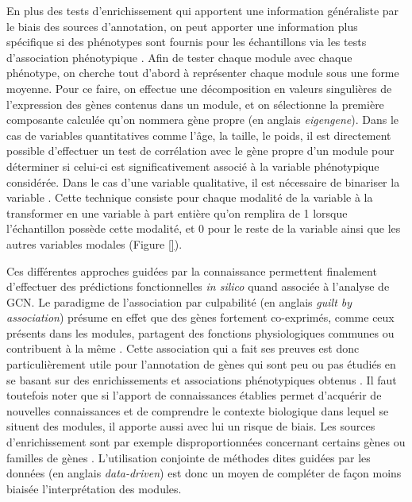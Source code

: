 

En plus des tests d'enrichissement qui apportent une information généraliste par le biais des sources d'annotation, on peut apporter une information plus spécifique si des phénotypes sont fournis pour les échantillons via les tests d'association phénotypique \cite{Langfelder2008}. Afin de tester chaque module avec chaque phénotype, on cherche tout d'abord à représenter chaque module sous une forme moyenne. Pour ce faire, on effectue une décomposition en valeurs singulières de l'expression des gènes contenus dans un module, et on sélectionne la première composante calculée qu'on nommera gène propre (en anglais \textit{eigengene}). Dans le cas de variables quantitatives comme l'âge, la taille, le poids, il est directement possible d'effectuer un test de corrélation avec le gène propre d'un module pour déterminer si celui-ci est significativement associé à la variable phénotypique considérée. Dans le cas d'une variable qualitative, il est nécessaire de binariser la variable \cite{Lemoine2021Dec}. Cette technique consiste pour chaque modalité de la variable à la transformer en une variable à part entière qu'on remplira de 1 lorsque l'échantillon possède cette modalité, et 0 pour le reste de la variable ainsi que les autres variables modales (Figure \ref{}).


Ces différentes approches guidées par la connaissance permettent finalement d'effectuer des prédictions fonctionnelles \textit{in silico} quand associée à l'analyse de \acrshort{GCN}. Le paradigme de l'association par culpabilité (en anglais \textit{guilt by association}) présume en effet que des gènes fortement co-exprimés, comme ceux présents dans les modules, partagent des fonctions physiologiques communes ou contribuent à la même \cite{Ballouz2015}. Cette association qui a fait ses preuves est donc particulièrement utile pour l'annotation de gènes qui sont peu ou pas étudiés en se basant sur des enrichissements et associations phénotypiques obtenus \cite{Wolfe2005}. Il faut toutefois noter que si l'apport de connaissances établies permet d'acquérir de nouvelles connaissances et de comprendre le contexte biologique dans lequel se situent des modules, il apporte aussi avec lui un risque de biais. Les sources d'enrichissement sont par exemple disproportionnées concernant certains gènes ou familles de gènes \cite{Timmons2015Dec}. L'utilisation conjointe de méthodes dites guidées par les données (en anglais \textit{data-driven}) est donc un moyen de compléter de façon moins biaisée l'interprétation des modules.


